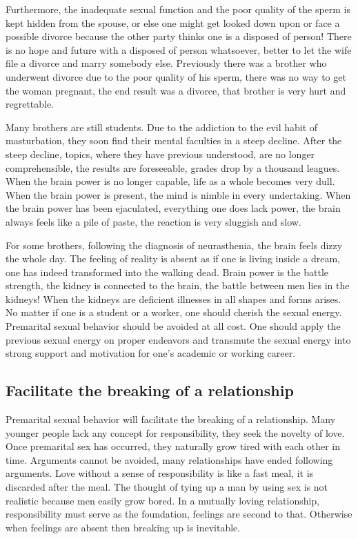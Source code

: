 \documentclass[
]{book}
\begin{document}
Furthermore, the inadequate sexual function and the poor quality of the sperm is kept hidden from the spouse, or else one might get looked down upon or face a possible divorce because the other party thinks one is a disposed of person! There is no hope and future with a disposed of person whatsoever, better to let the wife file a divorce and marry somebody else. Previously there was a brother who underwent divorce due to the poor quality of his sperm, there was no way to get the woman pregnant, the end result was a divorce, that brother is very hurt and regrettable.

Many brothers are still students. Due to the addiction to the evil habit of masturbation, they soon find their mental faculties in a steep decline. After the steep decline, topics, where they have previous understood, are no longer comprehensible, the results are foreseeable, grades drop by a thousand leagues. When the brain power is no longer capable, life as a whole becomes very dull. When the brain power is present, the mind is nimble in every undertaking. When the brain power has been ejaculated, everything one does lack power, the brain always feels like a pile of paste, the reaction is very sluggish and slow.

For some brothers, following the diagnosis of neurasthenia, the brain feels dizzy the whole day. The feeling of reality is absent as if one is living inside a dream, one has indeed transformed into the walking dead. Brain power is the battle strength, the kidney is connected to the brain, the battle between men lies in the kidneys! When the kidneys are deficient illnesses in all shapes and forms arises. No matter if one is a student or a worker, one should cherish the sexual energy. Premarital sexual behavior should be avoided at all cost. One should apply the previous sexual energy on proper endeavors and transmute the sexual energy into strong support and motivation for one's academic or working career.

\hypertarget{facilitate-the-breaking-of-a-relationship}{%
\subsection{Facilitate the breaking of a relationship}\label{facilitate-the-breaking-of-a-relationship}}

Premarital sexual behavior will facilitate the breaking of a relationship. Many younger people lack any concept for responsibility, they seek the novelty of love. Once premarital sex has occurred, they naturally grow tired with each other in time. Arguments cannot be avoided, many relationships have ended following arguments. Love without a sense of responsibility is like a fast meal, it is discarded after the meal. The thought of tying up a man by using sex is not realistic because men easily grow bored. In a mutually loving relationship, responsibility must serve as the foundation, feelings are second to that. Otherwise when feelings are absent then breaking up is inevitable.
\end{document}
